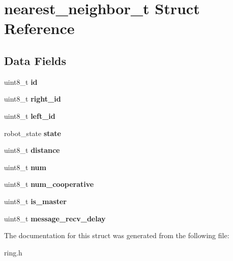 \hypertarget{structnearest__neighbor__t}{}\section{nearest\+\_\+neighbor\+\_\+t Struct Reference}
\label{structnearest__neighbor__t}
\subsection*{Data Fields}
\begin{DoxyCompactItemize}
\item 
\mbox{\label{structnearest__neighbor__t_a1e6927fa1486224044e568f9c370519b}} 
uint8\+\_\+t {\bfseries id}
\item 
\mbox{\label{structnearest__neighbor__t_ad5aa37b153f535af1fc07cf153ea8b75}} 
uint8\+\_\+t {\bfseries right\+\_\+id}
\item 
\mbox{\label{structnearest__neighbor__t_a4d823b5e183e24190a16da36f00a46fb}} 
uint8\+\_\+t {\bfseries left\+\_\+id}
\item 
\mbox{\label{structnearest__neighbor__t_aadbb2fcd5b6edab38e3aa5aca6d92439}} 
robot\+\_\+state {\bfseries state}
\item 
\mbox{\label{structnearest__neighbor__t_a99ae28d976be4f4b3aada22693153bea}} 
uint8\+\_\+t {\bfseries distance}
\item 
\mbox{\label{structnearest__neighbor__t_abea371f9030e15a5d2a4c181576833d8}} 
uint8\+\_\+t {\bfseries num}
\item 
\mbox{\label{structnearest__neighbor__t_ae24749d410d070a1979d9119a2f67147}} 
uint8\+\_\+t {\bfseries num\+\_\+cooperative}
\item 
\mbox{\label{structnearest__neighbor__t_a7d6cf807cdd93c9dd710d2a90dcd70a1}} 
uint8\+\_\+t {\bfseries is\+\_\+master}
\item 
\mbox{\label{structnearest__neighbor__t_a34976197c9a6041f13a077908b382ef5}} 
uint8\+\_\+t {\bfseries message\+\_\+recv\+\_\+delay}
\end{DoxyCompactItemize}


The documentation for this struct was generated from the following file\+:\begin{DoxyCompactItemize}
\item 
ring.\+h\end{DoxyCompactItemize}
